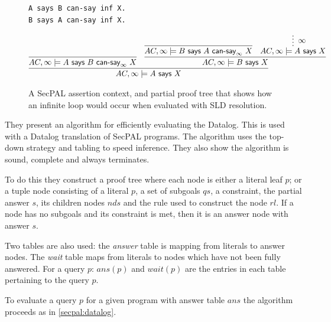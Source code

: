 \documentclass[a4paper,sfsidenotes]{%
  article%
}
\begin{document}
\begin{figure}\centering
  \begin{lstlisting}[language=SecPAL]
A says B can-say inf X.
B says A can-say inf X.
  \end{lstlisting}
  \begin{align*}
    \infer{ AC,\infty \models A\textsf{~says~}X }{%
    \infer{AC,\infty \models A \textsf{~says~} B \textsf{~can-say}_\infty~X}{} &
    \infer{AC,\infty \models B \textsf{~says~} X}{%
      \infer{AC,\infty \models B \textsf{~says~} A \textsf{~can-say}_\infty~X}{} &
    \infer*[\infty]{AC,\infty \models A \textsf{~says~} X}{}
      }
    }
  \end{align*}
  \caption{A SecPAL assertion context, and partial proof tree that shows how an
    infinite loop would occur when evaluated with \ac{SLD} resolution.}
  \label{secpal:inf}
\end{figure}

They present an algorithm for efficiently evaluating the Datalog. This is used
with a Datalog translation of
SecPAL programs.  The algorithm uses the top-down strategy and tabling to speed
inference. They also show the algorithm is sound, complete and always
terminates. 

To do this they construct a proof tree where each node is either a literal leaf
$p$; or a tuple node consisting of a literal $p$, a set of subgoals $qs$, a
constraint, the partial answer $s$, its children nodes $nds$ and the rule used
to construct the node $rl$.  If a node has no subgoals and its constraint
is met, then it is an answer node with answer $s$.

Two tables are also used: the \emph{answer} table is mapping from literals to
answer nodes.  The \emph{wait} table maps from literals to nodes which
have not been fully answered.  For a query $p$: $ans(p)$ and $wait(p)$ are the
entries in each table pertaining to the query $p$.

To evaluate a query $p$ for a given program with answer table $ans$ the
algorithm proceeds as in \autoref{secpal:datalog}.
\end{document}
